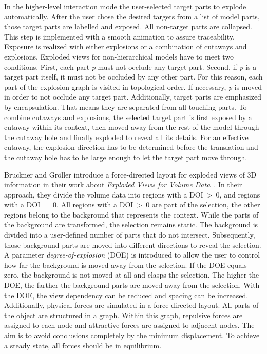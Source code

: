 In the higher-level interaction mode the user-selected target parts to explode automatically. After the user chose the desired targets from a list of model parts, those target parts are labelled and exposed. All non-target parts are collapsed. This step is implemented with a smooth animation to assure traceability. Exposure is realized with either explosions or a combination of cutaways and explosions. Exploded views for non-hierarchical models have to meet two conditions. First, each part \emph{p} must not occlude any target part. Second, if \emph{p} is a target part itself, it must not be occluded by any other part. For this reason, each part of the explosion graph is visited in topological order. If necessary, \emph{p} is moved in order to not occlude any target part. Additionally, target parts are emphasized by encapsulation. That means they are separated from all touching parts. To combine cutaways and explosions, the selected target part is first exposed by a cutaway within its context, then moved away from the rest of the model through the cutaway hole and finally exploded to reveal all its details. For an effective cutaway, the explosion direction has to be determined before the translation and the cutaway hole has to be large enough to let the target part move through.

Bruckner and Gr{\"o}ller introduce a force-directed layout for exploded views of 3D information in their work about \emph{Exploded Views for Volume Data}~\cite{jour:explodedView}. In their approach, they divide the volume data into regions with a DOI~>~0, and regions with a DOI~=~0. All regions with a DOI~>~0 are part of the selection, the other regions belong to the background that represents the context. While the parts of the background are transformed, the selection remains static. The background is divided into a user-defined number of parts that do not intersect. Subsequently, those background parts are moved into different directions to reveal the selection. A parameter \emph{degree-of-explosion} (DOE) is introduced to allow the user to control how far the background is moved away from the selection. If the DOE equals zero, the background is not moved at all and clasps the selection. The higher the DOE, the farther the background parts are moved away from the selection. With the DOE, the view dependency can be reduced and spacing can be increased. Additionally, physical forces are simulated in a force-directed layout. All parts of the object are structured in a graph. Within this graph, repulsive forces are assigned to each node and attractive forces are assigned to adjacent nodes. The aim is to avoid conclusions completely by the minimum displacement. To achieve a steady state, all forces should be in equilibrium.

